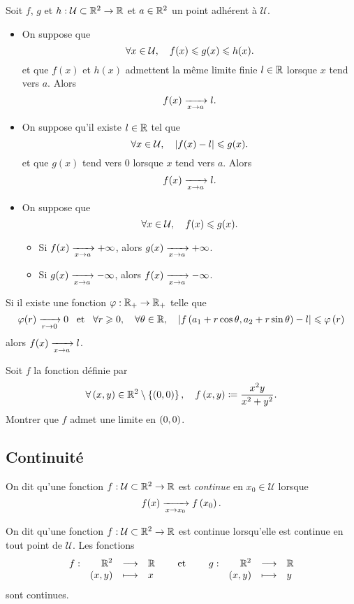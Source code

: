\documentclass{magnolia}
\begin{document}
\begin{proposition}
Soit $f$, $g$ et $h:\mathcal{U}\subset\mathbb{R}^2\to\mathbb{R}$ et $a\in\mathbb{R}^2$ un point adhérent à $\mathcal{U}$.
\begin{itemize}
\item On suppose que
  \[\forall x\in\mathcal{U} ,\quad f(x)\leqslant g(x)\leqslant h(x).\]
  et que $f(x)$ et $h(x)$ admettent la même limite finie $l\in\mathbb{R}$ lorsque
  $x$ tend vers $a$. Alors
  \[f(x)\xrightarrow[x\rightarrow a]{} l.\]
\item On suppose qu'il existe $l\in\mathbb{R}$ tel que
  \[\forall x\in\mathcal{U} ,\quad \left|f(x)-l\right| \leqslant g(x).\]
  et que $g(x)$ tend vers 0 lorsque $x$ tend vers $a$. Alors
  \[f(x)\xrightarrow[x\rightarrow a]{} l.\]
\item On suppose que
  \[\forall x\in\mathcal{U} ,\quad f(x)\leqslant g(x).\]
  \begin{itemize}
  \item Si $f(x)\xrightarrow[x\rightarrow a]{} +\infty$, alors $g(x)\xrightarrow[x\rightarrow a]{} +\infty$.
  \item Si $g(x)\xrightarrow[x\rightarrow a]{} -\infty$, alors $f(x)\xrightarrow[x\rightarrow a]{} -\infty$.
  \end{itemize}
\end{itemize}
\end{proposition}

\begin{remarqueUnique}
\remarque Si il existe une fonction $\varphi:\mathbb{R}_+\to\mathbb{R}_+$ telle que
  \[\varphi(r)\xrightarrow[r\rightarrow 0]{}0 \quad\!\text{et}\quad\!
    \forall r\geqslant 0 ,\quad \forall \theta\in\mathbb{R} ,\quad 
    \left|f\left(a_1+r\cos\theta,a_2+r\sin\theta\right)-l\right|\leqslant \varphi\left(r\right)\]
  alors $f(x)\xrightarrow[x\rightarrow a]{}l$.
\end{remarqueUnique}

\begin{exoUnique}
\exo Soit $f$ la fonction définie par
  \[\forall\left(x,y\right)\in\mathbb{R}^2\setminus\left\{\left(0,0\right)\right\} ,\quad
    f\left(x,y\right)\coloneqq\frac{x^2 y}{x^2+y^2}.\]
  Montrer que $f$ admet une limite en $\left(0,0\right)$.
\end{exoUnique}

\subsection{Continuité}

\begin{definition}
On dit qu'une fonction $f:\mathcal{U}\subset\mathbb{R}^2\to\mathbb{R}$ est \emph{continue} en $x_0\in\mathcal{U}$ lorsque
\[f(x)\xrightarrow[x\rightarrow x_0]{} f\left(x_0\right).\]
\end{definition}

\begin{remarques}
\remarque On dit qu'une fonction $f:\mathcal{U}\subset\mathbb{R}^2\to\mathbb{R}$ est continue lorsqu'elle est continue en tout
  point de $\mathcal{U}$.
\remarque Les fonctions
  \[\begin{array}[t]{lrcl} \displaystyle{f} : & \displaystyle{\mathbb{R}^2} & \longrightarrow & \displaystyle{\mathbb{R}} \\ & \displaystyle{(x,y)} & \longmapsto & \displaystyle{x} \end{array} \quad\quad\!\text{et}\quad\!\quad
    \begin{array}[t]{lrcl} \displaystyle{g} : & \displaystyle{\mathbb{R}^2} & \longrightarrow & \displaystyle{\mathbb{R}} \\ & \displaystyle{(x,y)} & \longmapsto & \displaystyle{y} \end{array}\]
  sont continues.
\end{remarques}
\end{document}
